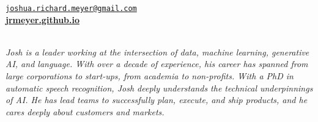 \documentclass{resume} %
\begin{document}
\vspace{-.25cm}
\begin{center}
\href{mailto:joshua.richard.meyer@gmail.com}{\nolinkurl{joshua.richard.meyer@gmail.com}}\\
\vspace{.15cm}
\href{https://jrmeyer.github.io}{\textbf{jrmeyer.github.io}} \\
\vspace{.15cm}
 \href{https://www.linkedin.com/in/josh-r-meyer/}{\faLinkedin} \hspace{.25cm} \href{https://github.com/JRMeyer}{\faGithub} \\

\vspace{.5cm}

\textit{Josh is a leader working at the intersection of data, machine learning, generative AI, and language. With over a decade of experience, his career has spanned from large corporations to start-ups, from academia to non-profits. With a PhD in automatic speech recognition, Josh deeply understands the technical underpinnings of AI. He has lead teams to successfully plan, execute, and ship products, and he cares deeply about customers and markets.}

\vspace{.5cm}

\end{center}


\vspace{.25cm}
\end{document}
